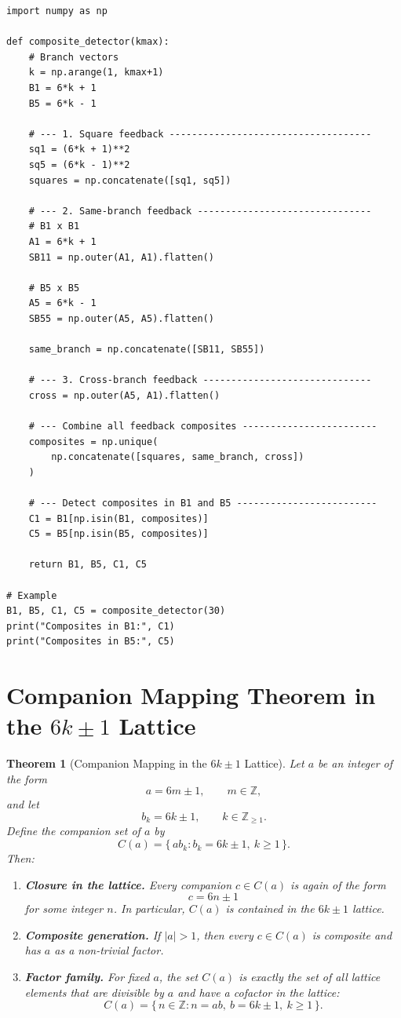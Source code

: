 \documentclass[12pt]{article}
\newtheorem{theorem}{Theorem}
\begin{document}
\begin{lstlisting}
import numpy as np

def composite_detector(kmax):
    # Branch vectors
    k = np.arange(1, kmax+1)
    B1 = 6*k + 1
    B5 = 6*k - 1

    # --- 1. Square feedback ------------------------------------
    sq1 = (6*k + 1)**2
    sq5 = (6*k - 1)**2
    squares = np.concatenate([sq1, sq5])

    # --- 2. Same-branch feedback -------------------------------
    # B1 x B1
    A1 = 6*k + 1
    SB11 = np.outer(A1, A1).flatten()

    # B5 x B5
    A5 = 6*k - 1
    SB55 = np.outer(A5, A5).flatten()

    same_branch = np.concatenate([SB11, SB55])

    # --- 3. Cross-branch feedback ------------------------------
    cross = np.outer(A5, A1).flatten()

    # --- Combine all feedback composites ------------------------
    composites = np.unique(
        np.concatenate([squares, same_branch, cross])
    )

    # --- Detect composites in B1 and B5 -------------------------
    C1 = B1[np.isin(B1, composites)]
    C5 = B5[np.isin(B5, composites)]

    return B1, B5, C1, C5

# Example
B1, B5, C1, C5 = composite_detector(30)
print("Composites in B1:", C1)
print("Composites in B5:", C5)
\end{lstlisting}

\section{Companion Mapping Theorem in the $6k\pm1$ Lattice}

\begin{theorem}[Companion Mapping in the $6k\pm1$ Lattice]
Let $a$ be an integer of the form
\[
a = 6m \pm 1, \qquad m \in \mathbb{Z},
\]
and let
\[
b_k = 6k \pm 1, \qquad k \in \mathbb{Z}_{\geq 1}.
\]
Define the companion set of $a$ by
\[
C(a) = \{\, a b_k : b_k = 6k \pm 1,\ k \geq 1 \,\}.
\]
Then:

\begin{enumerate}
\item \textbf{Closure in the lattice.} Every companion $c \in C(a)$ is again of
the form
\[
c = 6n \pm 1
\]
for some integer $n$. In particular, $C(a)$ is contained in the $6k\pm1$
lattice.

\item \textbf{Composite generation.} If $|a| > 1$, then every $c \in C(a)$ is
composite and has $a$ as a non-trivial factor.

\item \textbf{Factor family.} For fixed $a$, the set $C(a)$ is exactly the set
of all lattice elements that are divisible by $a$ and have a cofactor in the
lattice:
\[
C(a) = \{\, n \in \mathbb{Z} : n = ab,\ b = 6k\pm1,\ k \geq 1 \,\}.
\]
\end{enumerate}
\end{theorem}
\end{document}

